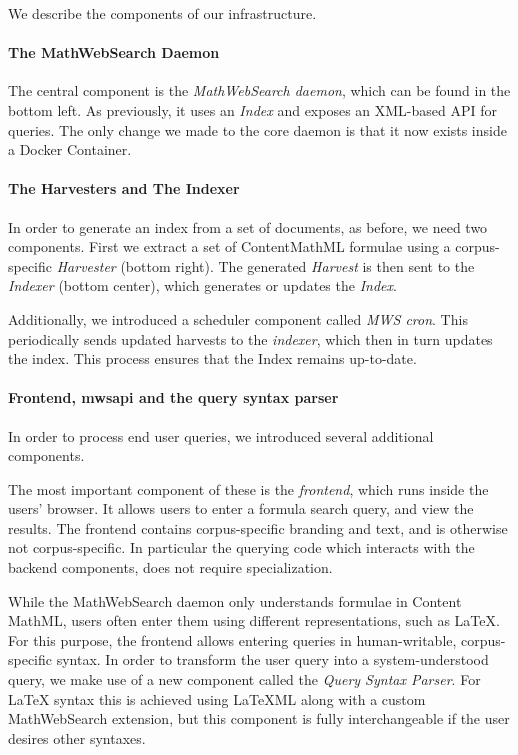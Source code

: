 We describe the components of our infrastructure. 

\paragraph{The MathWebSearch Daemon}
The central component is the \textit{MathWebSearch daemon}, which can be found in the bottom left. 
As previously, it uses an \textit{Index} and exposes an XML-based API for queries. 
The only change we made to the core daemon is that it now exists inside a Docker Container. 

\paragraph{The Harvesters and The Indexer}
In order to generate an index from a set of documents, as before, we need two components. 
First we extract a set of ContentMathML formulae using a corpus-specific \textit{Harvester} (bottom right). 
The generated \textit{Harvest} is then sent to the \textit{Indexer} (bottom center), which generates or updates the \textit{Index}. 

Additionally, we introduced a scheduler component called \textit{MWS cron}. 
This periodically sends updated harvests to the \textit{indexer}, which then in turn updates the index. 
This process ensures that the Index remains up-to-date. 

\paragraph{Frontend, mwsapi and the query syntax parser}

In order to process end user queries, we introduced several additional components.

The most important component of these is the \textit{frontend}, which runs inside the users' browser. 
It allows users to enter a formula search query, and view the results. 
The frontend contains corpus-specific branding and text, and is otherwise not corpus-specific. 
In particular the querying code which interacts with the backend components, does not require specialization. 

While the MathWebSearch daemon only understands formulae in Content MathML, users often enter them using different representations, such as \LaTeX. 
For this purpose, the frontend allows entering queries in human-writable, corpus-specific syntax. 
In order to transform the user query into a system-understood query, we make use of a new component called the \textit{Query Syntax Parser}. 
For {\LaTeX} syntax this is achieved using {\LaTeX}ML along with a custom MathWebSearch extension, but this component is fully interchangeable if the user desires other syntaxes. 

